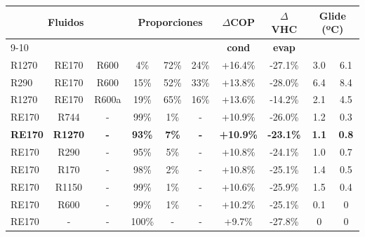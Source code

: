 
\begin{tabular}{|lcc|ccc|c|c|c|c|}
\hline
\multicolumn{3}{|c|}{\multirow{2}{*}{\textbf{Fluidos}}} & \multicolumn{3}{c|}{\multirow{2}{*}{\textbf{Proporciones}}} & \multicolumn{1}{c|}{\multirow{2}{*}{\textbf{$\Delta$COP}}} & \multicolumn{1}{c|}{\multirow{2}{*}{\textbf{$\Delta$VHC}}} & \multicolumn{2}{c|}{\textbf{Glide (ºC)}} \\ \cline{9-10} 
\multicolumn{3}{|c|}{} & \multicolumn{3}{c|}{} & \multicolumn{1}{c|}{} & \multicolumn{1}{c|}{} & \multicolumn{1}{c|}{\textbf{cond}} & \multicolumn{1}{c|}{\textbf{evap}} \\ \hline
R1270 & RE170 & R600 & 4\% & 72\% & 24\% & +16.4\% & -27.1\% & 3.0 & 6.1 \\ \hline
R290 & RE170 & R600 & 15\% & 52\% & 33\% & +13.8\% & -28.0\% & 6.4 & 8.4 \\ \hline
R1270 & RE170 & R600a & 19\% & 65\% & 16\% & +13.6\% & -14.2\% & 2.1 & 4.5 \\ \hline
RE170 & R744 & - & 99\% & 1\% & - & +10.9\% & -26.0\% & 1.2 & 0.3 \\ \hline
\textbf{RE170} & \textbf{R1270} & \textbf{-} & \textbf{93\%} & \textbf{7\%} & \textbf{-} & \textbf{+10.9\%} & \textbf{-23.1\%} & \textbf{1.1} & \textbf{0.8} \\ \hline
RE170 & R290 & - & 95\% & 5\% & - & +10.8\% & -24.1\% & 1.0 & 0.7 \\ \hline
RE170 & R170 & - & 98\% & 2\% & - & +10.8\% & -25.1\% & 1.4 & 0.5 \\ \hline
RE170 & R1150 & - & 99\% & 1\% & - & +10.6\% & -25.9\% & 1.5 & 0.4 \\ \hline
RE170 & R600 & - & 99\% & 1\% & - & +10.2\% & -25.1\% & 0.1 & 0 \\ \hline
RE170 & - & - & 100\% & - & - & +9.7\% & -27.8\% & 0 & 0 \\ \hline
\end{tabular}
